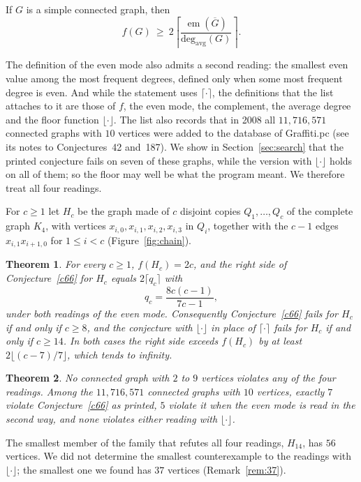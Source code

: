 \documentclass[11pt]{amsart}
\newtheorem{theorem}{Theorem}[section]
\theoremstyle{definition}
\newenvironment{conjecture}[1]{\renewcommand{\theinnerconj}{#1}\innerconj}{\endinnerconj}
\theoremstyle{remark}
\numberwithin{equation}{section}
\newcommand{\davg}{\operatorname{deg_{avg}}}
\newcommand{\emo}{\operatorname{em}}
\newcommand{\Gb}{\overline{G}}
\begin{document}
\begin{conjecture}{66}\label{c66}
If $G$ is a simple connected graph, then
\[
f(G)\ \ge\ 2\left\lceil \frac{\emo(\Gb)}{\davg(G)}\right\rceil .
\]
\end{conjecture}

The definition of the even mode also admits a second reading: the smallest even value among the most frequent degrees, defined only when some most frequent degree is even. And while the statement uses $\lceil\cdot\rceil$, the definitions that the list attaches to it are those of $f$, the even mode, the complement, the average degree and the floor function $\lfloor\cdot\rfloor$. The list also records that in 2008 all $11{,}716{,}571$ connected graphs with $10$ vertices were added to the database of Graffiti.pc (see its notes to Conjectures~42 and~187). We show in Section~\ref{sec:search} that the printed conjecture fails on seven of these graphs, while the version with $\lfloor\cdot\rfloor$ holds on all of them; so the floor may well be what the program meant. We therefore treat all four readings.

For $c\ge1$ let $H_c$ be the graph made of $c$ disjoint copies $Q_1,\dots,Q_c$ of the complete graph $K_4$, with vertices $x_{i,0},x_{i,1},x_{i,2},x_{i,3}$ in $Q_i$, together with the $c-1$ edges $x_{i,1}x_{i+1,0}$ for $1\le i<c$ (Figure~\ref{fig:chain}).

\begin{theorem}\label{thm:main}
For every $c\ge1$, $f(H_c)=2c$, and the right side of Conjecture~\ref{c66} for $H_c$ equals $2\lceil q_c\rceil$ with
\[
q_c=\frac{8c(c-1)}{7c-1},
\]
under both readings of the even mode. Consequently Conjecture~\ref{c66} fails for $H_c$ if and only if $c\ge8$, and the conjecture with $\lfloor\cdot\rfloor$ in place of $\lceil\cdot\rceil$ fails for $H_c$ if and only if $c\ge14$. In both cases the right side exceeds $f(H_c)$ by at least $2\lfloor (c-7)/7\rfloor$, which tends to infinity.
\end{theorem}

\begin{theorem}\label{thm:search}
No connected graph with $2$ to $9$ vertices violates any of the four readings. Among the $11{,}716{,}571$ connected graphs with $10$ vertices, exactly $7$ violate Conjecture~\ref{c66} as printed, $5$ violate it when the even mode is read in the second way, and none violates either reading with $\lfloor\cdot\rfloor$.
\end{theorem}

The smallest member of the family that refutes all four readings, $H_{14}$, has $56$ vertices. We did not determine the smallest counterexample to the readings with $\lfloor\cdot\rfloor$; the smallest one we found has $37$ vertices (Remark~\ref{rem:37}).
\end{document}
